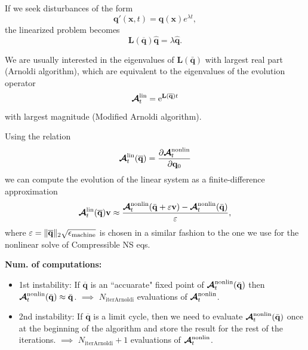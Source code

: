 \documentclass[aspectratio=43, xcolor=table]{beamer}
\begin{document}
\begin{frame}
	If we seek disturbances of the form
	$$
		\mathbf{q'}(\mathbf{x},t)
		=
		\hat{\mathbf q}(\mathbf{x}) e^{\lambda t},
	$$
	the linearized problem becomes
	$$
		\mathbf L(\overline{\mathbf q}) \hat{\mathbf q}
		=
		\lambda \hat{\mathbf q}.
	$$

	We are usually interested in the eigenvalues of
	$\mathbf L(\bar{\mathbf q})$
	with largest real part (Arnoldi algorithm),
	which are equivalent to the eigenvalues of the
	evolution operator
	$$
		\boldsymbol{\mathrm{\mathcal A}}_t^{\text{lin}}
		=
		\mathrm{e}^{{\mathbf L(\overline{\mathbf q}) t}}
	$$
	with largest magnitude (Modified Arnoldi algorithm).

\end{frame}
\begin{frame}

	Using the relation
	$$
		\boldsymbol{\mathrm{\mathcal{A}}}_t^{\text{lin}}(\mathbf{\overline{q}}) = \pdv{\boldsymbol{\mathrm{\mathcal{A}}}_t^\text{nonlin}}{\mathbf{q}_0}(\mathbf{\overline{q}})
	$$
	we can compute the evolution of the linear system as a finite-difference approximation
	$$
	\boldsymbol{\mathrm{\mathcal{A}}}_t^{\text{lin}}(\mathbf{\overline{q}})\mathbf v
		\approx
		\frac{
			\boldsymbol{\mathrm{\mathcal{A}}}_t^{\text {nonlin}}
		(\bar{\mathbf q}+\varepsilon \mathbf v)
		-
		\boldsymbol{\mathrm{\mathcal{A}}}_t^{\text{nonlin}}
		(\bar{\mathbf q})
		}{\varepsilon},
	$$
	where $\varepsilon=\|\boldsymbol{\mathrm{\overline{q}}}\|_2\sqrt{\epsilon_\text{machine}}$ is chosen in a similar fashion to the one we use for the nonlinear solve of Compressible NS eqs.

	\textbf{Num. of computations:}
	\begin{itemize}
		\item 1st instability: If $\overline{\mathbf q}$ is an ``accuarate" fixed point of $\boldsymbol{\mathrm{\mathcal{A}}}_t^{\rm nonlin}(\bar{\mathbf q})$ then  $\boldsymbol{\mathrm{\mathcal{A}}}_t^{\rm nonlin}(\bar{\mathbf q})\approx \bar{\mathbf q}$. $\implies$ $N_\text{iterArnoldi}$ evaluations of $\boldsymbol{\mathrm{\mathcal{A}}}_t^{\rm nonlin}$.
		\item 2nd instability: If $\overline{\mathbf q}$ is a limit cycle, then we need to evaluate $\boldsymbol{\mathrm{\mathcal{A}}}_t^{\rm nonlin}(\bar{\mathbf q})$ once at the beginning of the algorithm and store the result for the rest of the iterations. $\implies$ $N_\text{iterArnoldi} + 1$ evaluations of $\boldsymbol{\mathrm{\mathcal{A}}}_t^{\rm nonlin}$.
	\end{itemize}

\end{frame}
\end{document}
